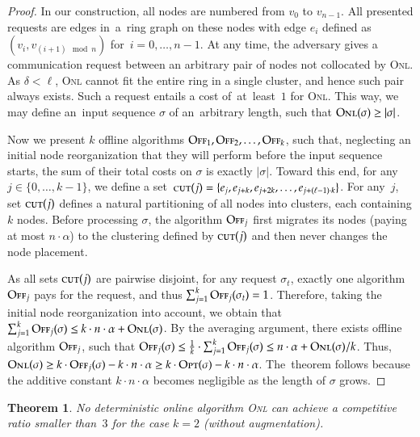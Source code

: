 \documentclass[11pt,a4paper]{scrartcl}
\newtheorem{theorem}{Theorem}
\newcommand{\ONL}{\textsc{Onl}\xspace}
\newcommand{\OFF}{\textsc{Off}\xspace}
\newcommand{\OPT}{\textsc{Opt}\xspace}
\newcommand{\cut}{\textsc{cut}}
\begin{document}
\begin{proof}
In our construction, all nodes are numbered from $v_0$ to $v_{n-1}$. All
presented requests are edges in~a~ring graph on these nodes with edge $e_i$
defined as $(v_i,v_{(i+1) \mod n })$ for~$i = 0, \ldots, n-1$. At any time,
the adversary gives a communication request between an arbitrary pair of nodes
not collocated by \ONL. As $\delta < \ell$, \ONL cannot fit the entire ring in
a single cluster, and hence such pair always exists. Such a request
entails a cost of~at~least~$1$ for \ONL. This way, we may define an~input
sequence $\sigma$ of an~arbitrary length, such that $\ONL(\sigma) \geq
|\sigma|$.

Now we present $k$ offline algorithms $\OFF_1, \OFF_2, \ldots, \OFF_k$, such
that, neglecting an initial node reorganization that they will perform before
the input sequence starts, the sum of their total costs on $\sigma$ is exactly
$|\sigma|$. Toward this end, for any $j \in \{0,\ldots,k-1\}$, we define a
set~$\cut(j) = \{ e_j, e_{j+k}, e_{j+2k},
\ldots, e_{j+(\ell-1)\cdot k} \}$. For any~$j$, set $\cut(j)$ defines a
natural partitioning of all nodes into clusters, each containing $k$ nodes.
Before processing $\sigma$, the algorithm $\OFF_j$ first migrates its nodes
(paying at most $n \cdot \alpha$) to the clustering defined by $\cut(j)$ and
then never changes the node placement.

As all sets $\cut(j)$ are pairwise disjoint, for any request $\sigma_t$,
exactly one algorithm $\OFF_j$ pays for the request, and thus $\sum_{j=1}^k
\OFF_j(\sigma_t) = 1$. Therefore, taking the initial node reorganization into
account, we obtain that $\sum_{j=1}^k \OFF_j(\sigma) \leq k \cdot n \cdot
\alpha + \ONL(\sigma)$. By the averaging argument, there exists offline
algorithm $\OFF_j$, such that $\OFF_j(\sigma) \leq \frac{1}{k} \cdot
\sum_{j=1}^k \OFF_j(\sigma) \leq n \cdot \alpha + \ONL(\sigma) / k$.
Thus, $\ONL(\sigma) \geq k \cdot \OFF_j(\sigma) - k \cdot n \cdot
\alpha \geq k \cdot \OPT(\sigma) - k \cdot n \cdot \alpha$.
The~theorem follows because the additive constant $k \cdot n \cdot \alpha$
becomes negligible as the length of $\sigma$ grows.
\end{proof}


\begin{theorem}
No deterministic online algorithm \ONL can achieve a competitive ratio 
smaller than~$3$ for the case $k = 2$ (without augmentation).
\end{theorem}
\end{document}
